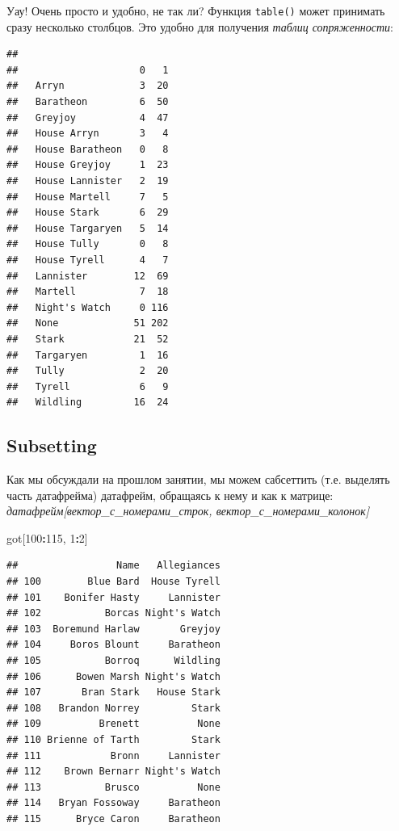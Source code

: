 \documentclass[]{book}
\newenvironment{Shaded}{\begin{snugshade}}{\end{snugshade}}
\newcommand{\KeywordTok}[1]{\textcolor[rgb]{0.13,0.29,0.53}{\textbf{#1}}}
\newcommand{\DecValTok}[1]{\textcolor[rgb]{0.00,0.00,0.81}{#1}}
\newcommand{\OperatorTok}[1]{\textcolor[rgb]{0.81,0.36,0.00}{\textbf{#1}}}
\newcommand{\NormalTok}[1]{#1}
\begin{document}
Уау! Очень просто и удобно, не так ли? Функция \texttt{table()} может
принимать сразу несколько столбцов. Это удобно для получения
\emph{таблиц сопряженности}:

\begin{Shaded}
\end{Shaded}

\begin{verbatim}
##                  
##                     0   1
##   Arryn             3  20
##   Baratheon         6  50
##   Greyjoy           4  47
##   House Arryn       3   4
##   House Baratheon   0   8
##   House Greyjoy     1  23
##   House Lannister   2  19
##   House Martell     7   5
##   House Stark       6  29
##   House Targaryen   5  14
##   House Tully       0   8
##   House Tyrell      4   7
##   Lannister        12  69
##   Martell           7  18
##   Night's Watch     0 116
##   None             51 202
##   Stark            21  52
##   Targaryen         1  16
##   Tully             2  20
##   Tyrell            6   9
##   Wildling         16  24
\end{verbatim}

\subsection{Subsetting}\label{subset}

Как мы обсуждали на прошлом занятии, мы можем сабсеттить (т.е. выделять
часть датафрейма) датафрейм, обращаясь к нему и как к матрице:
\emph{датафрейм{[}вектор\_с\_номерами\_строк,
вектор\_с\_номерами\_колонок{]}}

\begin{Shaded}
\begin{Highlighting}[]
\NormalTok{got[}\DecValTok{100}\OperatorTok{:}\DecValTok{115}\NormalTok{, }\DecValTok{1}\OperatorTok{:}\DecValTok{2}\NormalTok{]}
\end{Highlighting}
\end{Shaded}

\begin{verbatim}
##                 Name   Allegiances
## 100        Blue Bard  House Tyrell
## 101    Bonifer Hasty     Lannister
## 102           Borcas Night's Watch
## 103  Boremund Harlaw       Greyjoy
## 104     Boros Blount     Baratheon
## 105           Borroq      Wildling
## 106      Bowen Marsh Night's Watch
## 107       Bran Stark   House Stark
## 108   Brandon Norrey         Stark
## 109          Brenett          None
## 110 Brienne of Tarth         Stark
## 111            Bronn     Lannister
## 112    Brown Bernarr Night's Watch
## 113           Brusco          None
## 114   Bryan Fossoway     Baratheon
## 115      Bryce Caron     Baratheon
\end{verbatim}
\end{document}

